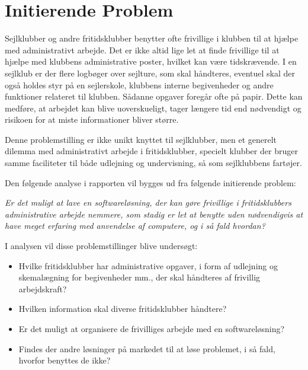 \section{Initierende Problem}
Sejlklubber og andre fritidsklubber benytter ofte frivillige i klubben til at hjælpe med administrativt arbejde. Det er
ikke altid lige let at finde frivillige til at hjælpe med klubbens administrative poster, hvilket kan være tidskrævende.
I en sejlklub er der flere logbøger over sejlture, som skal håndteres, eventuel skal der også holdes styr på en sejlerskole, klubbens interne begivenheder og andre funktioner relateret til klubben. 
Sådanne opgaver foregår ofte på papir. 
Dette kan medføre, at arbejdet kan blive uoverskueligt, tager længere tid end nødvendigt og risikoen for at miste informationer bliver større. 

Denne problemstilling er ikke unikt knyttet til sejlklubber, men et generelt dilemma med administrativt arbejde i
fritidsklubber, specielt klubber der bruger samme faciliteter til både udlejning og undervisning, så som sejlklubbens
fartøjer.

Den følgende analyse i rapporten vil bygges ud fra følgende initierende problem:

\textit{Er det muligt at lave en softwareløsning, der kan gøre frivillige i fritidsklubbers administrative arbejde
nemmere, som stadig er let at benytte uden nødvendigvis at have meget erfaring med anvendelse af computere, og i så fald
hvordan?}

I analysen vil disse problemstillinger blive undersøgt:
\begin{itemize}
\item Hvilke fritidsklubber har administrative opgaver, i form af udlejning og skemalægning for begivenheder mm., der
skal håndteres af frivillig arbejdskraft?
\item Hvilken information skal diverse fritidsklubber håndtere?
\item Er det muligt at organisere de frivilliges arbejde med en softwareløsning?
\item Findes der andre løsninger på markedet til at løse problemet, i så fald, hvorfor benyttes de ikke?
\end{itemize}